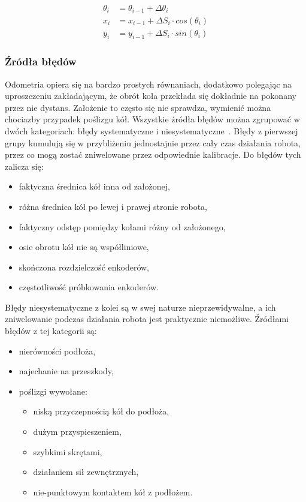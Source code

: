 \begin{align*}
\theta_i &= \theta_{i-1} + \Delta \theta_i \\
x_i &= x_{i-1} + \Delta S_i \cdot cos(\theta_i) \\
y_i &= y_{i-1} + \Delta S_i \cdot sin(\theta_i)
\end{align*}


\subsubsection{Źródła błędów}

Odometria opiera się na bardzo prostych równaniach, dodatkowo polegając na
uproszczeniu zakładającym, że obrót koła przekłada się dokładnie na pokonany
przez nie dystans. Założenie to często się nie sprawdza, wymienić można
chociazby przypadek poślizgu kół. Wszystkie źródła błędów można zgrupować w
dwóch kategoriach: błędy systematyczne i niesystematyczne~\cite{whereami}.
Błędy z pierwszej grupy kumulują się w przybliżeniu jednostajnie przez cały czas
działania robota, przez co mogą zostać zniwelowane przez odpowiednie kalibracje.
Do błędów tych zalicza się:
\begin{itemize}
  \item faktyczna średnica kół inna od założonej,
  \item różna średnica kół po lewej i prawej stronie robota,
  \item faktyczny odstęp pomiędzy kołami różny od założonego,
  \item osie obrotu kół nie są współliniowe,
  \item skończona rozdzielczość enkoderów,
  \item częstotliwość próbkowania enkoderów.
\end{itemize}

Błędy niesystematyczne z kolei są w swej naturze nieprzewidywalne, a ich
zniwelowanie podczas działania robota jest praktycznie niemożliwe. Źródłami
błędów z tej kategorii są:
\begin{itemize}
  \item nierówności podłoża,
  \item najechanie na przeszkody,
  \item poślizgi wywołane:
  \begin{itemize}
    \item niską przyczepnością kół do podłoża,
    \item dużym przyspieszeniem,
    \item szybkimi skrętami,
    \item działaniem sił zewnętrznych,
    \item nie-punktowym kontaktem kół z podłożem.
  \end{itemize}
\end{itemize}

